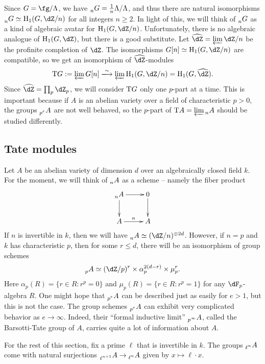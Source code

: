 Since $G=\fg/\Lambda$, we have $\prescript{}{n}{G}=\frac 1 n \Lambda/\Lambda$, and 
thus there are natural 
isomorphisms $\torsion n G\simeq \h_1(G,\dZ/n)$ for all integers $n\geqslant 2$. 
In light of this, we will think of $\prescript{}{n}{G}$ as a kind of algebraic avatar 
for $\h_1(G,\dZ/n)$. 
Unfortunately, there is no algebraic analogue of $\h_1(G,\dZ)$, but there is a 
good substitute. Let $\widehat\dZ=\varprojlim \dZ/n$ be the profinite 
completion of $\dZ$. The isomorphisms $G[n]\simeq \h_1(G,\dZ/n)$ are 
compatible, so we get an isomorphism of $\widehat\dZ$-modules 
\[
  \tate G := \varprojlim G[n] \isomorphism \varprojlim \h_1(G,\dZ/n) = \h_1(G,\widehat\dZ) \text{.}
\]
Since $\widehat\dZ=\prod_p \dZ_p$, we will consider $\mathrm{T} G$ only one $p$-part at 
a time. This is important because if $A$ is an abelian variety over a field of 
characteristic $p>0$, the groups $\prescript{}{p^e}{A}$ are not well behaved, so the 
$p$-part of $\mathrm{T} A=\varprojlim \prescript{}{n}{A}$ should be studied differently. 





\subsection{Tate modules}

Let $A$ be an abelian variety of dimension $d$ over an algebraically closed 
field $k$. For the moment, we will think of $\prescript{}{n}{A}$ as a scheme -- namely 
the fiber product 
\[\xymatrix{
  \torsion n A \ar[r] \ar[d] 
    & 0 \ar[d] \\
  A \ar[r]^-n 
    & A 
}\]
If $n$ is invertible in $k$, then we will have 
$\torsion n A\simeq (\dZ/n)^{\oplus 2 d}$. However, if $n=p$ and $k$ has 
characteristic $p$, then for some $r\leqslant d$, 
there will be an isomorphism of group schemes 
\[
   \torsion p A\simeq (\dZ/p)^r\times \alpha_p^{2(d-r)}\times \mu_p^r \text{.}
\]
Here $\alpha_p(R)=\{r\in R:r^p=0\}$ and $\mu_p(R)=\{r\in R:r^p=1\}$ for any 
$\dF_p$-algebra $R$. One might hope that $\prescript{}{p^e}{A}$ can be described just as 
easily for $e>1$, but this is not the case. The group schemes $\prescript{}{p^e}{A}$ can exhibit 
very complicated behavior as $e\to \infty$. Indeed, their ``formal inductive 
limit'' $\prescript{}{p^\infty}{A}$, called the Barsotti-Tate group of $A$, carries 
quite a lot of information about $A$. 

For the rest of this section, fix a prime $\ell$ that is invertible in $k$. 
The groups $\prescript{}{\ell^n}{A}$ come with natural surjections 
$\prescript{}{\ell^{n+1}}{A}\to \prescript{}{\ell^n}{A}$ given by $x\mapsto \ell \cdot x$. 

